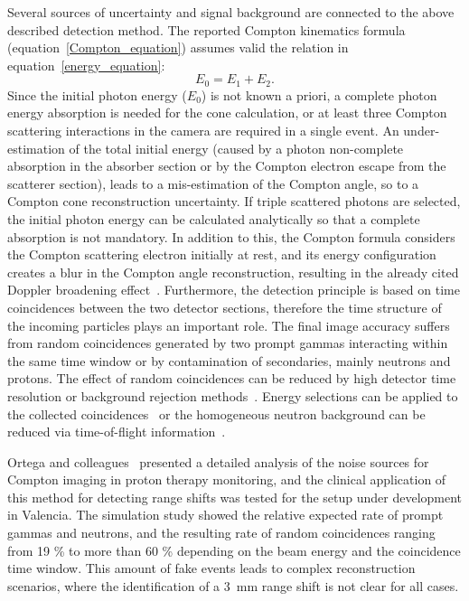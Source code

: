 Several sources of uncertainty and signal background are connected to the above described detection method. The reported Compton kinematics formula (equation~\ref{Compton_equation}) assumes valid the relation in equation~\ref{energy_equation}:
 \begin{equation}
E_{0} = E_{1}+E_{2}.
\label{energy_equation}
\end{equation} 
Since the initial photon energy (\(E_{0}\)) is not known a priori, a complete photon energy absorption is needed for the cone calculation, or at least three Compton scattering interactions in the camera are required in a single event. An under-estimation of the total initial energy (caused by a photon non-complete absorption in the absorber section or by the Compton electron escape from the scatterer section), leads to a mis-estimation of the Compton angle, so to a Compton cone reconstruction uncertainty. If triple scattered photons are selected, the initial photon energy can be calculated analytically so that a complete absorption is not mandatory. In addition to this, the Compton formula considers the Compton scattering electron initially at rest, and its energy configuration creates a blur in the Compton angle reconstruction, resulting in the already cited Doppler broadening effect~\cite{Doppler}. Furthermore, the detection principle is based on time coincidences between the two detector sections, therefore the time structure of the incoming particles plays an important role. The final image accuracy suffers from random coincidences generated by two prompt gammas interacting within the same time window or by contamination of secondaries, mainly neutrons and protons. The effect of random coincidences can be reduced by high detector time resolution or background rejection methods~\cite{Draeger:2017aa}. Energy selections can be applied to the collected coincidences~\cite{Polf:2009aa, Hilaire:2016aa} or the homogeneous neutron background can be reduced via time-of-flight information~\cite{Testa:2010aa}.

Ortega and colleagues~\cite{Ortega:2015aa} presented a detailed analysis of the noise sources for Compton imaging in proton therapy monitoring, and the clinical application of this method for detecting range shifts was tested for the setup under development in Valencia. The simulation study showed the relative expected rate of prompt gammas and neutrons, and the resulting rate of random coincidences ranging from 19 \% to more than 60 \% depending on the beam energy and the coincidence time window. This amount of fake events leads to complex reconstruction scenarios, where the identification of a 3~mm range shift is not clear for all cases.

